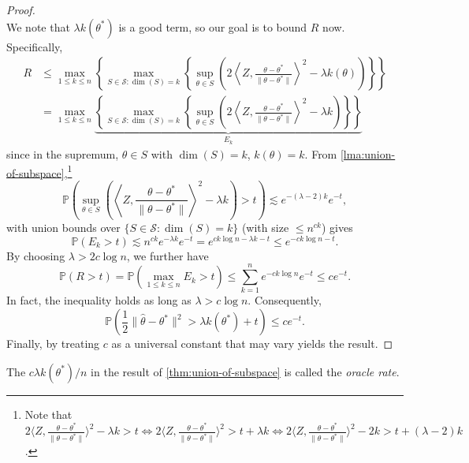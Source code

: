 \begin{proof}
\[	\]
	We note that \(\lambda k(\theta ^{\ast} )\) is a good term, so our goal is to bound \(R\) now. Specifically,
	\[
		\begin{split}
			R
			 & \leq \max _{1 \leq k \leq n} \left\{ \max _{S \in \mathcal{S} \colon \dim (S) = k} \left\{ \sup _{\theta \in S} \left( 2 \left\langle Z, \frac{\theta - \theta ^{\ast} }{\lVert \theta - \theta ^{\ast} \rVert } \right\rangle ^2 - \lambda k(\theta ) \right) \right\} \right\}         \\
			 & = \max _{1 \leq k \leq n} \underbrace{\left\{ \max _{S \in \mathcal{S} \colon \dim (S) = k} \left\{ \sup _{\theta \in S} \left( 2 \left\langle Z, \frac{\theta - \theta ^{\ast} }{\lVert \theta - \theta ^{\ast} \rVert } \right\rangle ^2 - \lambda k \right)  \right\} \right\}}_{E_k}
		\end{split}
	\]
	since in the supremum, \(\theta \in S\) with \(\dim (S) = k\), \(k(\theta ) = k\). From \autoref{lma:union-of-subspace},\footnote{Note that \( 2 \langle Z, \frac{\theta - \theta ^{\ast} }{\lVert \theta - \theta ^{\ast}  \rVert } \rangle ^2 - \lambda k > t \iff 2 \langle Z, \frac{\theta - \theta ^{\ast} }{\lVert \theta - \theta ^{\ast}  \rVert } \rangle ^2  > t + \lambda k \iff 2 \langle Z, \frac{\theta - \theta ^{\ast} }{\lVert \theta - \theta ^{\ast}  \rVert } \rangle ^2 - 2k > t + (\lambda - 2) k\).}
	\[
		\mathbb{P} \left(  \sup _{\theta \in S} \left( \left\langle Z, \frac{\theta - \theta ^{\ast} }{\lVert \theta - \theta ^{\ast} \rVert } \right\rangle ^2 - \lambda k \right) > t \right)
		\lesssim e^{-(\lambda - 2)k} e^{-t},
	\]
	with union bounds over \(\{ S\in \mathcal{S} \colon \dim (S) = k \} \) (with size \(\leq n^{ck}\)) gives
	\[
		\mathbb{P} (E_k > t)
		\lesssim n^{ck} e^{- \lambda k} e^{-t}
		= e^{ck \log n - \lambda k - t}
		\leq e^{-ck\log n - t}.
	\]
	By choosing \(\lambda > 2c \log n\), we further have
	\[
		\mathbb{P} (R > t)
		= \mathbb{P} \left( \max _{1 \leq k \leq n} E_k > t \right)
		\leq \sum_{k=1}^{n} e^{-ck \log n} e^{-t}
		\leq c e^{-t}.
	\]
	In fact, the inequality holds as long as \(\lambda > c \log n\). Consequently,
	\[
		\mathbb{P} \left( \frac{1}{2} \lVert \hat{\theta} - \theta ^{\ast} \rVert ^2 > \lambda k(\theta ^{\ast} ) + t \right) \leq c e^{-t}.
	\]
	Finally, by treating \(c\) as a universal constant that may vary yields the result.
\end{proof}

\begin{notation}\label{not:oracle-rate}
	The \(c \lambda k(\theta ^{\ast} ) / n\) in the result of \autoref{thm:union-of-subspace} is called the \emph{oracle rate}.
\end{notation}

